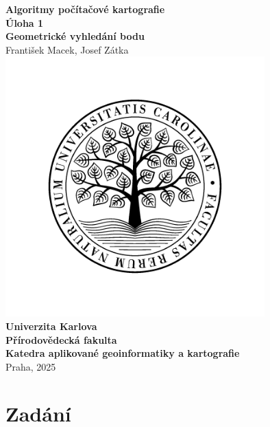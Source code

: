 \documentclass[a4paper,12pt]{article}
\begin{document}
\begin{titlepage}
    \begin{center}
        {\huge \bfseries Algoritmy počítačové kartografie}\\
        \vspace{3.5em}
        {\Large \bfseries Úloha 1} \\
        \vspace{0.5em}
        {\Large \bfseries Geometrické vyhledání bodu} \\
        \vspace{3.5em}
        {\large František Macek, Josef Zátka} \\
        \vspace{2.5em}
        \includegraphics[width=10cm]{logo.png}\\
        \vspace{-2em}
        { \bfseries Univerzita Karlova}\\
        \vspace{0.33em}
        { \bfseries Přírodovědecká fakulta}\\
        \vspace{0.33em}
        { \bfseries Katedra aplikované geoinformatiky a kartografie}\\
        \vspace{10em}
        {\large Praha, 2025}
    \end{center}
\end{titlepage}

\section{Zadání}
\end{document}
